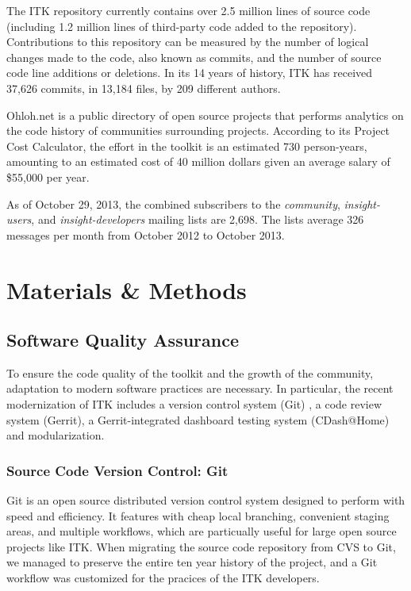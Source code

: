 \documentclass{frontiersENG} %
\begin{document}
%
%
The ITK repository currently contains over 2.5 million lines of source code
(including 1.2 million lines of third-party code added to the repository).
Contributions to this repository can be measured by the number of logical
changes made to the code, also known as commits, and the number of source code
line additions or deletions. In its 14 years of history, ITK has received
37,626 commits, in 13,184 files, by 209 different authors.

Ohloh.net \cite{OhlohITK2013} is a public directory of open source projects
that performs analytics on the code history of communities surrounding
projects. According to its Project Cost Calculator, the effort in the toolkit
is an estimated 730 person-years, amounting to an estimated cost of 40 million
dollars given an average salary of \$55,000 per year.

As of October 29, 2013, the combined subscribers to the \textit{community},
\textit{insight-users}, and \textit{insight-developers} mailing lists are 2,698.
The lists average 326 messages per month from October 2012 to October 2013.


\section{Materials \& Methods}

\subsection{Software Quality Assurance}

To ensure the code quality of the toolkit and the growth of the community,
adaptation to modern software practices are necessary. In particular, the
recent modernization of ITK includes a version control system (Git) , a code
review system (Gerrit), a Gerrit-integrated dashboard testing system
(CDash@Home) and modularization.

\subsubsection{Source Code Version Control: Git} Git is an open source
distributed version control system designed to perform with speed and
efficiency. It features with cheap local branching, convenient staging areas,
and multiple workflows, which are particually useful for large open source
projects like ITK. When migrating the source code repository from CVS to Git,
we managed to preserve the entire ten year history of the project, and  a Git
workflow was customized for the pracices of the ITK developers.
\end{document}
